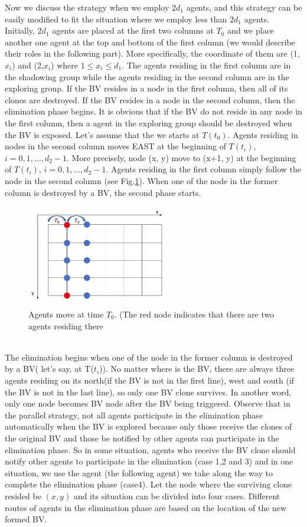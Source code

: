 Now we discuss the strategy when we employ $2d_1$ agents, and this strategy can be easily modified to fit the situation where we employ less than $2d_1$ agents.\\
Initially, 2$d_1$ agents are placed at the first two columns at $T_0$ and we place another one agent at the top and bottom of the first column (we would describe their roles in the following part). More specifically, the coordinate of them are (1, $x_i$) and (2,$x_i$) where $1\leq x_i\leq d_1$. The agents residing in the first column are in the shadowing group while the agents residing in the second column are in the exploring group. If the BV resides in a node in the first column, then all of its clones are destroyed. If the BV resides in a node in the second column, then the elimination phase begins. It is obvious that if the BV do not reside in any node in the first column, then a agent in the exploring group should be destroyed when the BV is exposed.  Let's assume that the we starts at $T(t_0)$. Agents residing in nodes in the second column moves EAST at the beginning of $T(t_i)$, $i=0,1, \ldots ,d_2-1$. More precisely, node (x, y) move to (x+1, y) at the beginning of $T(t_i)$, $i=0,1, \dots , d_2-1$. Agents residing in the first column simply follow the node in the second column (see  Fig.\ref{fig:moving}). When one of the node in the former column is destroyed by a BV, the second phase starts.
\begin{figure}[H]
  \centering  
  \includegraphics[width=2.5in]{figures/moving.png}
  \caption{Agents move at time $T_0$. (The red node indicates that there are two agents residing there}\label{fig:moving}
\end{figure}
\\
The elimination begins when one of the node in the former column is destroyed by a BV( let's say, at T($t_i$)). No matter where is the BV, there are always three agents residing on its north(if the BV is not in the first line), west and south (if the BV is not in the last line), so only one BV clone survives. In another word, only one node becomes BV node after the BV being triggered. Observe that in the parallel strategy, not all agents participate in the elimination phase automatically when the BV is explored because only those receive the clones of the original BV and those be notified by other agents can participate in the elimination phase. So in some situation, agents who receive the BV clone should notify other agents to participate in the elimination (case 1,2 and 3) and in one situation, we use the agent (the following agent) we take along the way to complete the elimination phase (case4). Let the node where the surviving clone resided be $(x, y)$ and its situation can be divided into four cases. Different routes of agents in the elimination phase are based on the location of the new formed BV.
